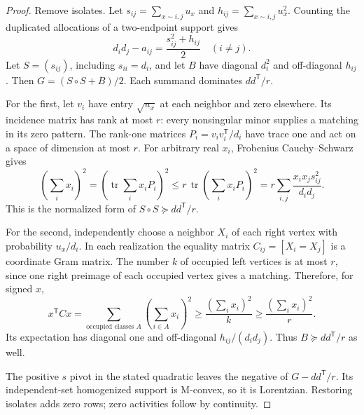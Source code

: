 \documentclass[11pt,a4paper]{article}
\theoremstyle{remark}\newtheorem{remark}[theorem]{Remark}
\newcommand{\PSD}{\succeq}                 %
\begin{document}
\begin{proof}
Remove isolates. Let
$s_{ij}=\sum_{x\sim i,j}u_x$ and $h_{ij}=\sum_{x\sim i,j}u_x^2$.
Counting the duplicated allocations of a two-endpoint support gives
\[
 d_id_j-a_{ij}=\frac{s_{ij}^2+h_{ij}}2\quad(i\ne j).
\]
Let $S=(s_{ij})$, including $s_{ii}=d_i$, and let $B$ have diagonal $d_i^2$
and off-diagonal $h_{ij}$. Then $G=(S\circ S+B)/2$.
Each summand dominates $dd^{\mathsf T}/r$.

For the first, let $v_i$ have entry $\sqrt{u_x}$ at each neighbor and zero
elsewhere. Its incidence matrix has rank at most $r$: every nonsingular
minor supplies a matching in its zero pattern. The rank-one matrices
$P_i=v_iv_i^{\mathsf T}/d_i$ have trace one and act on a space of dimension
at most $r$. For arbitrary real $x_i$, Frobenius Cauchy--Schwarz gives
\[
 \left(\sum_i x_i\right)^2=
 \left(\operatorname{tr}\sum_i x_iP_i\right)^2
 \le r\,\operatorname{tr}\left(\sum_i x_iP_i\right)^2
 =r\sum_{i,j}\frac{x_ix_js_{ij}^2}{d_id_j}.
\]
This is the normalized form of $S\circ S\PSD dd^{\mathsf T}/r$.

For the second, independently choose a neighbor $X_i$ of each right vertex
with probability $u_x/d_i$. In each realization the equality matrix
$C_{ij}=[X_i=X_j]$ is a coordinate Gram matrix. The number $k$ of occupied
left vertices is at most $r$, since one right preimage of each occupied
vertex gives a matching. Therefore, for signed $x$,
\[
 x^{\mathsf T}Cx=
 \sum_{\text{occupied classes }A}\left(\sum_{i\in A}x_i\right)^2
 \ge\frac{(\sum_i x_i)^2}{k}
 \ge\frac{(\sum_i x_i)^2}{r}.
\]
Its expectation has diagonal one and off-diagonal $h_{ij}/(d_id_j)$.
Thus $B\PSD dd^{\mathsf T}/r$ as well.

The positive $s$ pivot in the stated quadratic leaves the negative of
$G-dd^{\mathsf T}/r$. Its independent-set homogenized support is
M-convex, so it is Lorentzian. Restoring isolates adds zero rows;
zero activities follow by continuity.
\end{proof}
\end{document}
